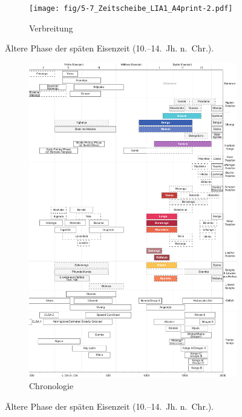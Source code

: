 \begin{figure}[p]
	\centering
	\begin{subfigure}[b]{\textwidth}
		\centering
		\texttt{[image: fig/5-7\_Zeitscheibe\_LIA1\_A4print-2.pdf]}
		\vspace{4cm}
		\caption{Verbreitung}
		\label{fig:LIA1_Karte}
	\end{subfigure}
	\caption{Ältere Phase der späten Eisenzeit (10.--14.~Jh. n.~Chr.).}
	\label{}
\end{figure}
\addtocounter{figure}{-1}
\begin{figure}[p]
	\begin{subfigure}[b]{\textwidth}
		\setcounter{subfigure}{1}
		\centering
		\includegraphics[height = .9\textheight]{fig/Chronologiesystem_v4_Zeitscheibe_LIA1.pdf}
		\caption{Chronologie}
		\label{fig:LIA1_Chronologie}
	\end{subfigure}
	\caption{Ältere Phase der späten Eisenzeit (10.--14.~Jh. n.~Chr.).}
	\label{fig:LIA1}
\end{figure}

